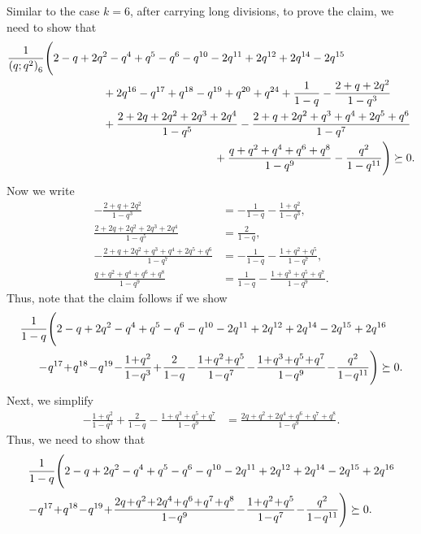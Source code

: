 \documentclass[12pt,reqno]{amsart}
\renewcommand{\(}{\left\(}
\renewcommand{\)}{\right\)}
\numberwithin{equation}{section}
\theoremstyle{plain}
\theoremstyle{definition}
\numberwithin{equation}{section}
\begin{document}
Similar to the case $k=6$, after carrying long divisions, to prove the claim, we need to show that
\begin{align*}
&\frac{1}{\left(q;q^2\right)_6} \Biggl(2 - q + 2q^2 - q^4 + q^5 - q^6 - q^{10} - 2 q^{11} + 2 q^{12} + 2 q^{14} - 2 q^{15}\\
&\hspace{3 cm}  + 2 q^{16} - q^{17}+ q^{18} - q^{19} + q^{20}+q^{24}+\frac{1}{1-q}-\frac{2+q+2 q^2}{1-q^3}\\
&\hspace{3 cm} +\frac{2 + 2 q + 2 q^2 + 2 q^3 + 2 q^4}{1-q^5}-\frac{2 +q +2 q^2 +q^3 +q^4 +2 q^5 + q^6}{1-q^7}\\
&\hspace{6.5 cm} +\frac{q + q^2 + q^4 + q^6 + q^8}{1-q^9}-\frac{q^{2}}{1-q^{11}} \Biggr)\succeq 0.
\end{align*}
Now we write
\begin{align*}
-\frac{2+q+2q^2}{1-q^3} &=- \frac{1}{1-q} -\frac{1+q^2}{1-q^3},\\
\frac{2+2q+2q^2+2q^3+2q^4}{1-q^5} &= \frac{2}{1-q},\\
- \frac{2+q+2q^2+q^3+q^4+2q^5+q^6}{1-q^7} &= - \frac{1}{1-q} - \frac{1+q^2+q^5}{1-q^7},\\
\frac{q + q^2 + q^4 + q^6 + q^8}{1-q^9}&=\frac{1}{1-q}-\frac{1+q^3+q^5+q^7}{1-q^9}.
\end{align*}
Thus, note that the claim follows if we show 
\begin{align*}%
&\frac{1}{1-q} \Biggl(2 - q + 2q^2 - q^4 + q^5 - q^6 - q^{10} - 2 q^{11} + 2 q^{12} + 2 q^{14} - 2 q^{15} + 2 q^{16}\nonumber\\
&\hspace{0.5 cm}-\!q^{17}\!+\!q^{18}\!-\!q^{19}\!-\!\frac{1\!+\! q^2}{1\!-\!q^3}\!+\!\frac{2}{1\!-\!q}\!-\!\frac{1\!+\! q^2\!+\!q^5}{1\!-\!q^7}\!-\!\frac{1\!+\!q^3\!+\!q^5\!+\!q^7}{1\!-\!q^9}\!-\!\frac{q^{2}}{1\!-\!q^{11}} \Biggr)\succeq 0.
\end{align*}
Next, we simplify
\begin{align*}
-\frac{1+ q^2}{1-q^3}+\frac{2}{1-q}-\frac{1+q^3 + q^5 + q^7}{1-q^9}
&=\frac{2 q + q^2 + 2 q^4 + q^6 + q^7 + q^8}{1-q^9}.
\end{align*}
Thus, we need to show that
\begin{align}\label{eqn7b}
&\frac{1}{1-q} \Biggl(2 - q + 2q^2 - q^4 + q^5 - q^6 - q^{10} - 2 q^{11} + 2 q^{12} + 2 q^{14} - 2 q^{15} + 2 q^{16} \nonumber\\
&\hspace{0 cm} \!-\!q^{17}\!+\! q^{18}\!-\!q^{19}\!+\!\frac{2 q\!+\!q^2\!+\!2 q^4\!+\! q^6\!+\! q^7\!+\! q^8}{1\!-\!q^9}%
\!-\!\frac{1\!+\!q^2\!+\!q^5}{1\!-\!q^7}\!-\!\frac{q^{2}}{1\!-\!q^{11}} \Biggr)\succeq 0.
\end{align}
\end{document}
